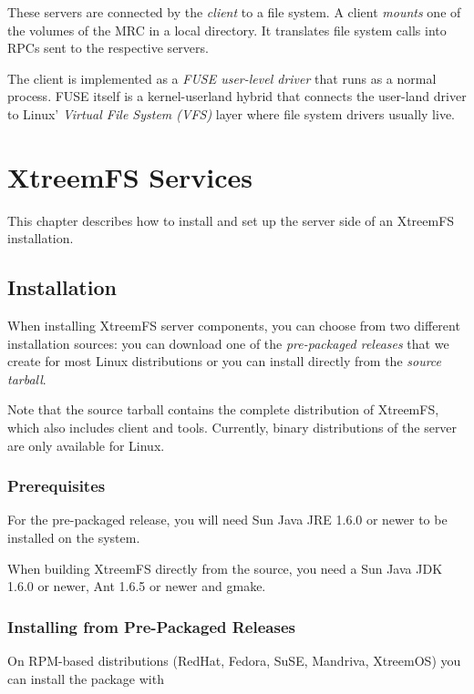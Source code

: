 \documentclass[a4paper,10pt]{book}
\begin{document}
These servers are connected by the \emph{client} to a file system. A client \emph{mounts} one of the volumes of the MRC in a local directory. It translates file system calls into RPCs sent to the respective servers.

The client is implemented as a \emph{FUSE user-level driver} that runs as a normal process. FUSE itself is a kernel-userland hybrid that connects the user-land driver to Linux' \emph{Virtual File System (VFS)} layer where file system drivers usually live.


\chapter{XtreemFS Services}

This chapter describes how to install and set up the server side of an XtreemFS installation.

\section{Installation}

When installing XtreemFS server components, you can choose from two different installation sources: you can download one of the \emph{pre-packaged releases} that we create for most Linux distributions or you can install directly from the \emph{source tarball}.

Note that the source tarball contains the complete distribution of XtreemFS, which also includes client and tools. Currently, binary distributions of the server are only available for Linux.

\subsection{Prerequisites}

For the pre-packaged release, you will need Sun Java JRE 1.6.0 or newer to be installed on the system.

When building XtreemFS directly from the source, you need a Sun Java JDK 1.6.0 or newer, Ant 1.6.5 or newer and gmake.

\subsection{Installing from Pre-Packaged Releases}

On RPM-based distributions (RedHat, Fedora, SuSE, Mandriva, XtreemOS) you can install the package with
\end{document}
